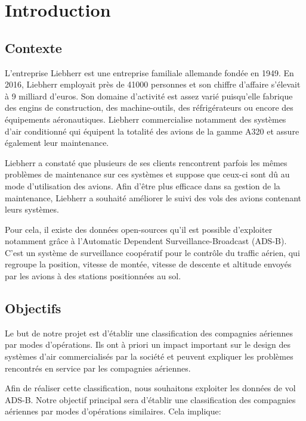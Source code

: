 \chapter*{Introduction}
\label{chap:introduction}

\section*{Contexte}

L'entreprise Liebherr est une entreprise familiale allemande fondée en 1949. En 2016, Liebherr employait près de 41000 personnes et son chiffre d'affaire s'élevait à 9 milliard d'euros. Son domaine d'activité est assez varié puisqu'elle fabrique des engins de construction, des machine-outils, des réfrigérateurs ou encore des équipements aéronautiques. Liebherr commercialise notamment des systèmes d'air conditionné qui équipent la totalité des avions de la gamme A320 et assure également leur maintenance.

Liebherr a constaté que plusieurs de ses clients rencontrent parfois les mêmes problèmes de maintenance sur ces systèmes et suppose que ceux-ci sont dû au mode d'utilisation des avions. Afin d'être plus efficace dans sa gestion de la maintenance, Liebherr a souhaité améliorer le suivi des vols des avions contenant leurs systèmes. 

Pour cela, il existe des données open-sources qu'il est possible d'exploiter notamment grâce à l'Automatic Dependent Surveillance-Broadcast (ADS-B). C'est un système de surveillance coopératif pour le contrôle du traffic aérien, qui regroupe la position, vitesse de montée, vitesse de descente et altitude envoyés par les avions à des stations positionnées au sol.

\section*{Objectifs}

Le but de notre projet est d'établir une classification des compagnies aériennes par modes d'opérations. Ils ont à priori un impact important sur le design des systèmes d'air commercialisés par la société et peuvent expliquer les problèmes rencontrés en service par les compagnies aériennes.

Afin de réaliser cette classification, nous souhaitons exploiter les données de vol ADS-B. Notre objectif principal sera d'établir une classification des compagnies aériennes par modes d'opérations similaires. Cela implique:

